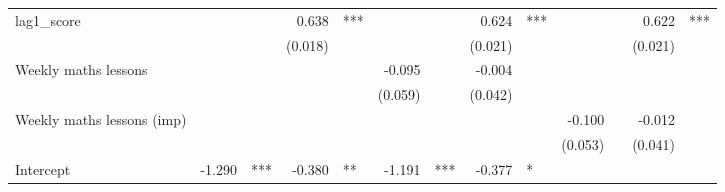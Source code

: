 \documentclass{article}
\begin{document}
\begin{table}[!h]
\begin{tabular}{lllllllllllll}
\multicolumn{1}{l}{lag1\_score} &
  \multicolumn{1}{r}{} &
  \multicolumn{1}{l}{} &
  \multicolumn{1}{r}{0.638} &
  \multicolumn{1}{l}{***} &
  \multicolumn{1}{r}{} &
  \multicolumn{1}{l}{} &
  \multicolumn{1}{r}{0.624} &
  \multicolumn{1}{l}{***} &
  \multicolumn{1}{r}{} &
  \multicolumn{1}{l}{} &
  \multicolumn{1}{r}{0.622} &
  \multicolumn{1}{l}{***} \\
\multicolumn{1}{l}{} &
  \multicolumn{1}{r}{} &
  \multicolumn{1}{l}{} &
  \multicolumn{1}{r}{(0.018)} &
  \multicolumn{1}{l}{} &
  \multicolumn{1}{r}{} &
  \multicolumn{1}{l}{} &
  \multicolumn{1}{r}{(0.021)} &
  \multicolumn{1}{l}{} &
  \multicolumn{1}{r}{} &
  \multicolumn{1}{l}{} &
  \multicolumn{1}{r}{(0.021)} &
  \multicolumn{1}{l}{} \\
\multicolumn{1}{l}{Weekly maths lessons} &
  \multicolumn{1}{r}{} &
  \multicolumn{1}{l}{} &
  \multicolumn{1}{r}{} &
  \multicolumn{1}{l}{} &
  \multicolumn{1}{r}{-0.095} &
  \multicolumn{1}{l}{} &
  \multicolumn{1}{r}{-0.004} &
  \multicolumn{1}{l}{} &
  \multicolumn{1}{r}{} &
  \multicolumn{1}{l}{} &
  \multicolumn{1}{r}{} &
  \multicolumn{1}{l}{} \\
\multicolumn{1}{l}{} &
  \multicolumn{1}{r}{} &
  \multicolumn{1}{l}{} &
  \multicolumn{1}{r}{} &
  \multicolumn{1}{l}{} &
  \multicolumn{1}{r}{(0.059)} &
  \multicolumn{1}{l}{} &
  \multicolumn{1}{r}{(0.042)} &
  \multicolumn{1}{l}{} &
  \multicolumn{1}{r}{} &
  \multicolumn{1}{l}{} &
  \multicolumn{1}{r}{} &
  \multicolumn{1}{l}{} \\
\multicolumn{1}{l}{Weekly maths lessons (imp)} &
  \multicolumn{1}{r}{} &
  \multicolumn{1}{l}{} &
  \multicolumn{1}{r}{} &
  \multicolumn{1}{l}{} &
  \multicolumn{1}{r}{} &
  \multicolumn{1}{l}{} &
  \multicolumn{1}{r}{} &
  \multicolumn{1}{l}{} &
  \multicolumn{1}{r}{-0.100} &
  \multicolumn{1}{l}{} &
  \multicolumn{1}{r}{-0.012} &
  \multicolumn{1}{l}{} \\
\multicolumn{1}{l}{} &
  \multicolumn{1}{r}{} &
  \multicolumn{1}{l}{} &
  \multicolumn{1}{r}{} &
  \multicolumn{1}{l}{} &
  \multicolumn{1}{r}{} &
  \multicolumn{1}{l}{} &
  \multicolumn{1}{r}{} &
  \multicolumn{1}{l}{} &
  \multicolumn{1}{r}{(0.053)} &
  \multicolumn{1}{l}{} &
  \multicolumn{1}{r}{(0.041)} &
  \multicolumn{1}{l}{} \\
\multicolumn{1}{l}{Intercept} &
  \multicolumn{1}{r}{-1.290} &
  \multicolumn{1}{l}{***} &
  \multicolumn{1}{r}{-0.380} &
  \multicolumn{1}{l}{**} &
  \multicolumn{1}{r}{-1.191} &
  \multicolumn{1}{l}{***} &
  \multicolumn{1}{r}{-0.377} &
  \multicolumn{1}{l}{*} &

\end{tabular}
\end{table}
\end{document}

